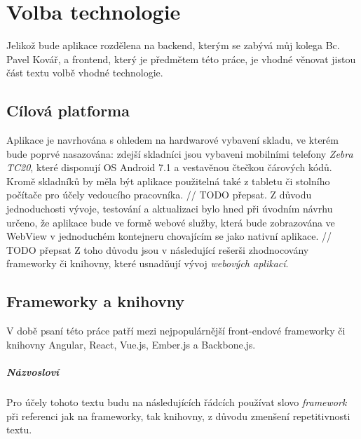 \chapter{Volba technologie}\label{technology}

Jelikož bude aplikace rozdělena na backend, kterým se zabývá můj kolega Bc. Pavel Kovář, a frontend, který je předmětem této práce, je vhodné věnovat jistou část textu volbě vhodné technologie.

\section{Cílová platforma}

Aplikace je navrhována s ohledem na hardwarové vybavení skladu, ve kterém bude poprvé nasazována: zdejší skladníci jsou vybaveni mobilními telefony \emph{Zebra TC20}, které disponují OS Android 7.1 a vestavěnou čtečkou čárových kódů. Kromě skladníků by měla být aplikace použitelná také z tabletu či stolního počítače pro účely vedoucího pracovníka. // TODO přepsat. Z důvodu jednoduchosti vývoje,  testování a aktualizaci bylo hned při úvodním návrhu určeno, že aplikace bude ve formě webové služby, která bude zobrazována ve WebView v jednoduchém kontejneru chovajícím se jako nativní aplikace. // TODO přepsat
Z toho důvodu jsou v následující rešerši zhodnocovány frameworky či knihovny, které usnadňují vývoj \emph{webových aplikací}.


\section{Frameworky a knihovny}

V době psaní této práce patří mezi nejpopulárnější\cite{frameworks-github}\cite{frameworks-hackr} front-endové frameworky či knihovny Angular\cite{angular}, React\cite{react}, Vue.js\cite{vue}, Ember.js\cite{ember} a Backbone.js\cite{backbone}.

\paragraph{Názvosloví} Pro účely tohoto textu budu na následujících řádcích používat slovo \emph{framework} při referenci jak na frameworky, tak knihovny, z důvodu zmenšení repetitivnosti textu.\\

